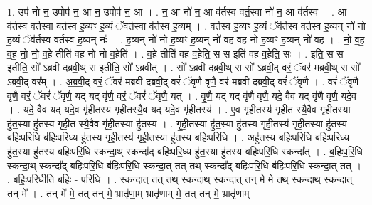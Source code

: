 \documentclass[17pt]{extarticle}
\begin{document}
1. उप॑ नो न॒ उपोप॑ न॒ आ न॒ उपोप॑ न॒ आ । . न॒ आ नो॑ न॒ आ व॑र्तस्व वर्त॒स्वा नो॑ न॒ आ व॑र्तस्व । . आ व॑र्तस्व वर्त॒स्वा व॑र्तस्व ह॒व्यꣳ ह॒व्यं ॅव॑र्त॒स्वा व॑र्तस्व ह॒व्यम् । . व॒र्त॒स्व॒ ह॒व्यꣳ ह॒व्यं ॅव॑र्तस्व वर्तस्व ह॒व्यन् नो॑ नो ह॒व्यं ॅव॑र्तस्व वर्तस्व ह॒व्यन् नः॑ । . ह॒व्यन् नो॑ नो ह॒व्यꣳ ह॒व्यन् नो॑ वह वह नो ह॒व्यꣳ ह॒व्यन् नो॑ वह । . नो॒ व॒ह॒ व॒ह॒ नो॒ नो॒ व॒हे तीति॑ वह नो नो व॒हेति॑ । . व॒हे तीति॑ वह व॒हेति॒ स स इति॑ वह व॒हेति॒ सः । . इति॒ स स इतीति॒ सो᳚ ऽब्रवी दब्रवी॒थ् स इतीति॒ सो᳚ ऽब्रवीत् । . सो᳚ ऽब्रवी दब्रवी॒थ् स सो᳚ ऽब्रवी॒द् वरं॒ ॅवर॑ मब्रवी॒थ् स सो᳚ ऽब्रवी॒द् वर᳚म् । . अ॒ब्र॒वी॒द् वरं॒ ॅवर॑ मब्रवी दब्रवी॒द् वरं॑ ॅवृणै वृणै॒ वर॑ मब्रवी दब्रवी॒द् वरं॑ ॅवृणै । . वरं॑ ॅवृणै वृणै॒ वरं॒ ॅवरं॑ ॅवृणै॒ यद् यद् वृ॑णै॒ वरं॒ ॅवरं॑ ॅवृणै॒ यत् । . वृ॒णै॒ यद् यद् वृ॑णै वृणै॒ यदे॒ वैव यद् वृ॑णै वृणै॒ यदे॒व । . यदे॒ वैव यद् यदे॒व गृ॑ही॒तस्य॑ गृही॒तस्यै॒व यद् यदे॒व गृ॑ही॒तस्य॑ । . ए॒व गृ॑ही॒तस्य॑ गृही॒त स्यै॒वैव गृ॑ही॒तस्या हु॑त॒स्या हु॑तस्य गृही॒त स्यै॒वैव गृ॑ही॒तस्या हु॑तस्य । . गृ॒ही॒तस्या हु॑त॒स्या हु॑तस्य गृही॒तस्य॑ गृही॒तस्या हु॑तस्य बहिःपरि॒धि ब॑हिःपरि॒ध्य हु॑तस्य गृही॒तस्य॑ गृही॒तस्या हु॑तस्य बहिःपरि॒धि । . अहु॑तस्य बहिःपरि॒धि ब॑हिःपरि॒ध्य हु॑त॒स्या हु॑तस्य बहिःपरि॒धि स्कन्दा॒थ् स्कन्दा᳚द् बहिःपरि॒ध्य हु॑त॒स्या हु॑तस्य बहिःपरि॒धि स्कन्दा᳚त् । . ब॒हिः॒प॒रि॒धि स्कन्दा॒थ् स्कन्दा᳚द् बहिःपरि॒धि ब॑हिःपरि॒धि स्कन्दा॒त् तत् तथ् स्कन्दा᳚द् बहिःपरि॒धि ब॑हिःपरि॒धि स्कन्दा॒त् तत् । . ब॒हिः॒प॒रि॒धीति॑ बहिः - प॒रि॒धि । . स्कन्दा॒त् तत् तथ् स्कन्दा॒थ् स्कन्दा॒त् तन् मे॑ मे॒ तथ् स्कन्दा॒थ् स्कन्दा॒त् तन् मे᳚ । . तन् मे॑ मे॒ तत् तन् मे॒ भ्रातृ॑णा॒म् भ्रातृ॑णाम् मे॒ तत् तन् मे॒ भ्रातृ॑णाम् । \newline
\end{document}
